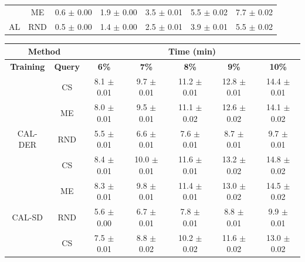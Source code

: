 \begin{table}[htbp]
\begin{tabular*}{\linewidth}{c|c|@{\extracolsep{\fill}}ccccc}
 & ME & 0.6 $\pm$ {\small 0.00} & 1.9 $\pm$ {\small 0.00} & 3.5 $\pm$ {\small 0.01} & 5.5 $\pm$ {\small 0.02} & 7.7 $\pm$ {\small 0.02}\\

\multirow{-3}{*}{\raggedright\arraybackslash AL} & RND & 0.5 $\pm$ {\small 0.00} & 1.4 $\pm$ {\small 0.00} & 2.5 $\pm$ {\small 0.01} & 3.9 $\pm$ {\small 0.01} & 5.5 $\pm$ {\small 0.02}\\
\bottomrule
\end{tabular*}
\vspace{0.5em}

\begin{tabular*}{\linewidth}{c|c|@{\extracolsep{\fill}}ccccc}
\toprule
\multicolumn{2}{c|}{\textbf{Method}} & \multicolumn{5}{c}{\textbf{Time (min)}} \\
\midrule
\textbf{Training} & \textbf{Query} & \textbf{6\%} & \textbf{7\%} & \textbf{8\%} & \textbf{9\%} & \textbf{10\%}\\
\midrule
 & CS & 8.1 $\pm$ {\small 0.01} & 9.7 $\pm$ {\small 0.01} & 11.2 $\pm$ {\small 0.01} & 12.8 $\pm$ {\small 0.01} & 14.4 $\pm$ {\small 0.01}\\

 & ME & 8.0 $\pm$ {\small 0.01} & 9.5 $\pm$ {\small 0.01} & 11.1 $\pm$ {\small 0.02} & 12.6 $\pm$ {\small 0.02} & 14.1 $\pm$ {\small 0.02}\\

\multirow{-3}{*}{\raggedright\arraybackslash CAL-DER} & RND & 5.5 $\pm$ {\small 0.01} & 6.6 $\pm$ {\small 0.01} & 7.6 $\pm$ {\small 0.01} & 8.7 $\pm$ {\small 0.01} & 9.7 $\pm$ {\small 0.01}\\
\midrule
 & CS & 8.4 $\pm$ {\small 0.01} & 10.0 $\pm$ {\small 0.01} & 11.6 $\pm$ {\small 0.01} & 13.2 $\pm$ {\small 0.02} & 14.8 $\pm$ {\small 0.02}\\

 & ME & 8.3 $\pm$ {\small 0.01} & 9.8 $\pm$ {\small 0.01} & 11.4 $\pm$ {\small 0.01} & 13.0 $\pm$ {\small 0.02} & 14.5 $\pm$ {\small 0.02}\\

\multirow{-3}{*}{\raggedright\arraybackslash CAL-SD} & RND & 5.6 $\pm$ {\small 0.00} & 6.7 $\pm$ {\small 0.01} & 7.8 $\pm$ {\small 0.01} & 8.8 $\pm$ {\small 0.01} & 9.9 $\pm$ {\small 0.01}\\
\midrule
 & CS & 7.5 $\pm$ {\small 0.01} & 8.8 $\pm$ {\small 0.02} & 10.2 $\pm$ {\small 0.02} & 11.6 $\pm$ {\small 0.02} & 13.0 $\pm$ {\small 0.02}\\


\end{tabular*}
\end{table}
